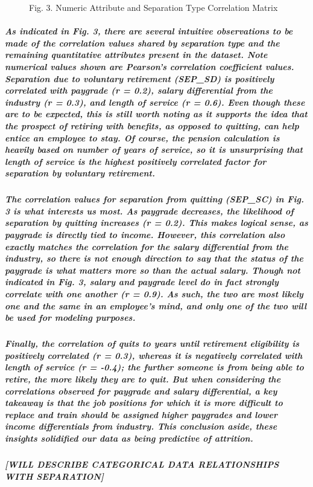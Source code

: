 \documentclass{article}
\begin{document}
\begin{figure}
\caption{Fig. 3. Numeric Attribute and Separation Type Correlation Matrix}
\end{figure}
 
\subparagraph{As indicated in Fig. 3, there are several intuitive observations to be made of the correlation values shared by separation type and the remaining quantitative attributes present in the dataset. Note numerical values shown are Pearson’s correlation coefficient values. Separation due to voluntary retirement (SEP\_SD) is positively correlated with paygrade (r = 0.2), salary differential from the industry (r = 0.3), and length of service (r = 0.6). Even though these are to be expected, this is still worth noting as it supports the idea that the prospect of retiring with benefits, as opposed to quitting, can help entice an employee to stay. Of course, the pension calculation is heavily based on number of years of service, so it is unsurprising that length of service is the highest positively correlated factor for separation by voluntary retirement.}
 
\subparagraph{The correlation values for separation from quitting (SEP\_SC) in Fig. 3 is what interests us most.  As paygrade decreases, the likelihood of separation by quitting increases (r = 0.2). This makes logical sense, as paygrade is directly tied to income.  However, this correlation also exactly matches the correlation for the salary differential from the industry, so there is not enough direction to say that the status of the paygrade is what matters more so than the actual salary. Though not indicated in Fig. 3, salary and paygrade level do in fact strongly correlate with one another (r = 0.9). As such, the two are most likely one and the same in an employee's mind, and only one of the two will be used for modeling purposes.}
 
\subparagraph{Finally, the correlation of quits to years until retirement eligibility is positively correlated (r = 0.3), whereas it is negatively correlated with length of service (r = -0.4); the further someone is from being able to retire, the more likely they are to quit. But when considering the correlations observed for paygrade and salary differential, a key takeaway is that the job positions for which it is more difficult to replace and train should be assigned higher paygrades and lower income differentials from industry. This conclusion aside, these insights solidified our data as being predictive of attrition.}

\subparagraph{[WILL DESCRIBE CATEGORICAL DATA RELATIONSHIPS WITH SEPARATION]}
\end{document}
